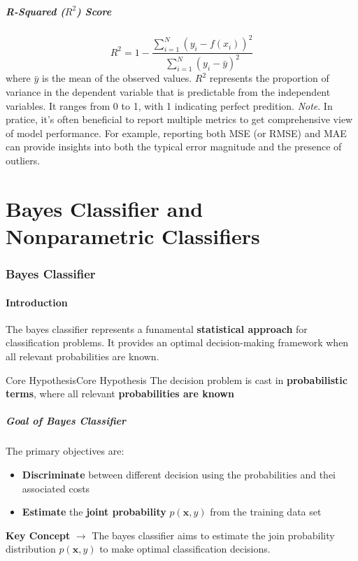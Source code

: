 \documentclass[a4paper]{article}
\theoremstyle{definition}
\begin{document}
\subsubsection{R-Squared (\( R^2 \)) Score}
\[
  R^2 = 1 - \frac{\sum_{i = 1}^{N} (y_i - f(x_i))^2}{\sum_{i = 1}^{N} (y_i - \bar{y})^2}
\]
where \( \bar{y} \) is the mean of the observed values. \( R^2 \) represents the proportion of variance in the dependent 
variable that is predictable from the independent variables. It ranges from 0 to 1,
with 1 indicating perfect predition.
\vspace{1em}
\noindent
\newline
\textit{Note}. In pratice, it's often beneficial to report multiple metrics to get comprehensive view 
of model performance. For example, reporting both MSE (or RMSE) and MAE can provide 
insights into both the typical error magnitude and the presence of outliers.
\part{Bayes Classifier and Nonparametric Classifiers}
\section{Bayes Classifier}
\subsection{Introduction}
The bayes classifier represents a funamental \textbf{statistical approach} for classification problems.
It provides an optimal decision-making framework when all relevant probabilities are known.
\begin{theorem}{Core Hypothesis}{Core Hypothesis}
The decision problem is cast in \textbf{probabilistic terms}, where all relevant \textbf{probabilities are known}
\end{theorem}
\subsubsection{Goal of Bayes Classifier}
The primary objectives are:
\begin{itemize}
    \item \textbf{Discriminate} between different decision using the probabilities and thei associated costs 
    \item \textbf{Estimate} the \textbf{joint probability} \(p(\textbf{x},y) \) from the training data set
\end{itemize}
\textbf{Key Concept} \( \rightarrow \) The bayes classifier aims to estimate the join probability distribution \( p(\textbf{x},y) \) to make optimal classification decisions.
\end{document}
